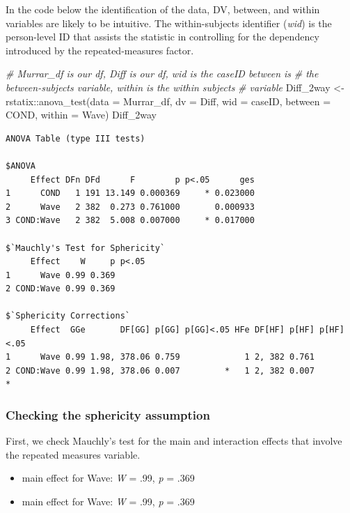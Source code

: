 \documentclass[
  11pt,
]{book}
\newenvironment{Shaded}{\begin{snugshade}}{\end{snugshade}}
\newcommand{\AttributeTok}[1]{\textcolor[rgb]{0.77,0.63,0.00}{#1}}
\newcommand{\CommentTok}[1]{\textcolor[rgb]{0.56,0.35,0.01}{\textit{#1}}}
\newcommand{\FunctionTok}[1]{\textcolor[rgb]{0.00,0.00,0.00}{#1}}
\newcommand{\NormalTok}[1]{#1}
\newcommand{\OtherTok}[1]{\textcolor[rgb]{0.56,0.35,0.01}{#1}}
\newcommand{\SpecialCharTok}[1]{\textcolor[rgb]{0.00,0.00,0.00}{#1}}
\providecommand{\tightlist}{%
  \setlength{\itemsep}{0pt}\setlength{\parskip}{0pt}}
\begin{document}
In the code below the identification of the data, DV, between, and within variables are likely to be intuitive. The within-subjects identifier (\emph{wid}) is the person-level ID that assists the statistic in controlling for the dependency introduced by the repeated-measures factor.

\begin{Shaded}
\begin{Highlighting}[]
\CommentTok{\# Murrar\_df is our df, Diff is our df, wid is the caseID between is}
\CommentTok{\# the between{-}subjects variable, within is the within subjects}
\CommentTok{\# variable}
\NormalTok{Diff\_2way }\OtherTok{\textless{}{-}}\NormalTok{ rstatix}\SpecialCharTok{::}\FunctionTok{anova\_test}\NormalTok{(}\AttributeTok{data =}\NormalTok{ Murrar\_df, }\AttributeTok{dv =}\NormalTok{ Diff, }\AttributeTok{wid =}\NormalTok{ caseID,}
    \AttributeTok{between =}\NormalTok{ COND, }\AttributeTok{within =}\NormalTok{ Wave)}
\NormalTok{Diff\_2way}
\end{Highlighting}
\end{Shaded}

\begin{verbatim}
ANOVA Table (type III tests)

$ANOVA
     Effect DFn DFd      F        p p<.05      ges
1      COND   1 191 13.149 0.000369     * 0.023000
2      Wave   2 382  0.273 0.761000       0.000933
3 COND:Wave   2 382  5.008 0.007000     * 0.017000

$`Mauchly's Test for Sphericity`
     Effect    W     p p<.05
1      Wave 0.99 0.369      
2 COND:Wave 0.99 0.369      

$`Sphericity Corrections`
     Effect  GGe       DF[GG] p[GG] p[GG]<.05 HFe DF[HF] p[HF] p[HF]<.05
1      Wave 0.99 1.98, 378.06 0.759             1 2, 382 0.761          
2 COND:Wave 0.99 1.98, 378.06 0.007         *   1 2, 382 0.007         *
\end{verbatim}

\hypertarget{checking-the-sphericity-assumption}{%
\subsubsection{Checking the sphericity assumption}\label{checking-the-sphericity-assumption}}

First, we check Mauchly's test for the main and interaction effects that involve the repeated measures variable.

\begin{itemize}
\tightlist
\item
  main effect for Wave: \emph{W} = .99, \emph{p} = .369
\item
  main effect for Wave: \emph{W} = .99, \emph{p} = .369
\end{itemize}
\end{document}
